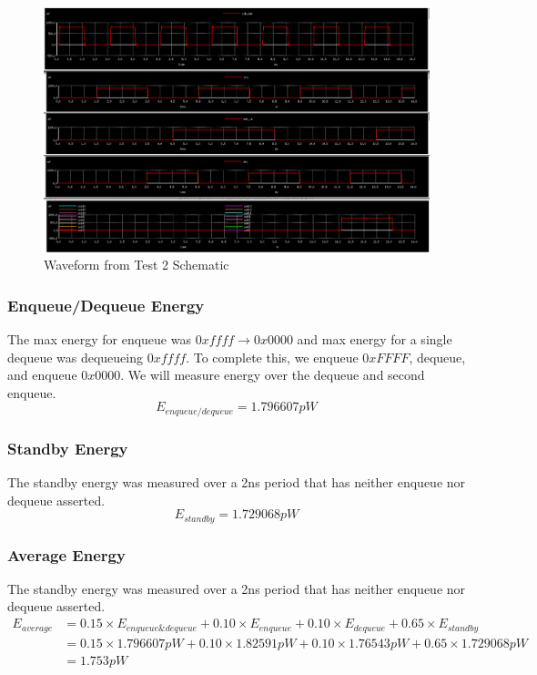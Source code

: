 \documentclass[a4paper]{article}
\begin{document}
\begin{figure}[H]
	\centering
	\includegraphics[scale=0.25]{topLevelTestEnergyWaveform}
	\caption{Waveform from Test 2 Schematic}
	\label{fig:topLevelTestEnergyWaveform}
\end{figure}

\subsubsection{Enqueue/Dequeue Energy}
The max energy for enqueue was $0xffff \rightarrow 0x0000$ and max energy for a single dequeue was dequeueing $0xffff$. To complete this, we enqueue $0xFFFF$, dequeue, and enqueue $0x0000$. We will measure energy over the dequeue and second enqueue.
$$E_{enqueue/dequeue} = 1.796607pW$$

\subsubsection{Standby Energy}
The standby energy was measured over a 2ns period that has neither enqueue nor dequeue asserted.
$$E_{standby} = 1.729068pW$$

\subsubsection{Average Energy}
The standby energy was measured over a 2ns period that has neither enqueue nor dequeue asserted.
\begin{align*}
E_{average} &= 0.15 \times E_{enqueue\&dequeue} + 0.10 \times E_{enqueue} + 0.10 \times E_{dequeue} + 0.65 \times E_{standby}\\
&= 0.15 \times 1.796607pW + 0.10 \times 1.82591pW + 0.10 \times 1.76543pW + 0.65 \times 1.729068pW\\
&= 1.753pW\\
\end{align*}
\end{document}

